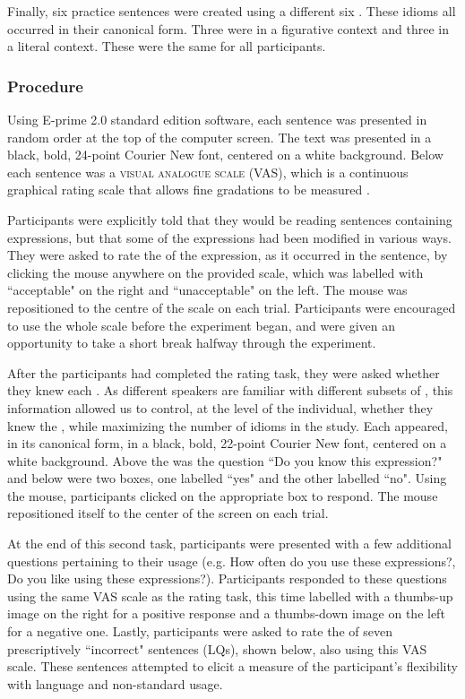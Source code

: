 \documentclass[output=paper
,modfonts
,nonflat]{langsci/langscibook}
\begin{document}
Finally, six practice sentences were created using a different six . These idioms all occurred in their canonical form. Three were in a figurative context and three in a literal context. These were the same for all participants. 


\subsubsection{Procedure}

Using E-prime 2.0 standard edition software, each sentence was presented in random order at the top of the computer screen. The text was presented in a black, bold, 24-point Courier New font, centered on a white background. Below each sentence was a \textsc{visual analogue scale} (VAS), which is a continuous graphical rating scale that allows fine gradations to be measured \citep{FunkeReips2012}. 

Participants were explicitly told that they would be reading sentences containing  expressions, but that some of the expressions had been modified in various ways. They were asked to rate the  of the expression, as it occurred in the sentence, by clicking the mouse anywhere on the provided scale, which was labelled with ``acceptable" on the right and ``unacceptable" on the left. The mouse was repositioned to the centre of the scale on each trial. Participants were encouraged to use the whole scale before the experiment began, and were given an opportunity to take a short break halfway through the experiment. 

After the participants had completed the rating task, they were asked whether they knew each . As different speakers are familiar with different subsets of , this information allowed us to control, at the level of the individual, whether they knew the  \citep{Cacciari2005}, while maximizing the number of idioms in the study. Each  appeared, in its canonical form, in a black, bold, 22-point Courier New font, centered on a white background. Above the  was the question ``Do you know this expression?" and below were two boxes, one labelled ``yes" and the other labelled ``no". Using the mouse, participants clicked on the appropriate box to respond. The mouse repositioned itself to the center of the screen on each trial.

At the end of this second task, participants were presented with a few additional questions pertaining to their   usage (e.g. How often do you use these expressions?, Do you like using these expressions?). Participants responded to these questions using the same VAS scale as the rating task, this time labelled with a thumbs-up image on the right for a positive response and a thumbs-down image on the left for a negative one. Lastly, participants were asked to rate the  of seven prescriptively ``incorrect" sentences (LQs), shown below, also using this VAS scale. These sentences attempted to elicit a measure of the participant's flexibility with language and non-standard usage.\\
\end{document}
